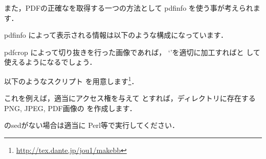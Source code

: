 また，PDFの正確な\BB を取得する一つの方法として
{pdfinfo} を使う事が考えられます．

{pdfinfo} によって表示される情報は以下のような構成になっています．


{pdfcrop} によって切り抜きを行った画像であれば，
`'を適切に加工すれば\BB と
して使えるようになるでしょう．%

以下のようなスクリプト を用意します\footnote{\url{http://tex.dante.jp/jou1/makebb}}．


これを例えば，適当にアクセス権を与えて 
とすれば，ディレクトリに存在するPNG, JPEG, PDF画像の
\BB を作成します．

の{sed}がない場合は適当に 
{Perl}等で実行してください．


